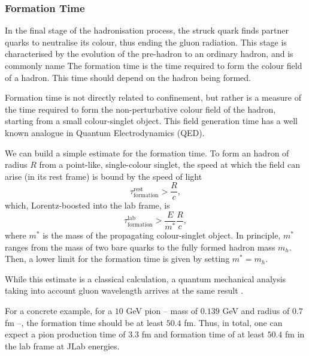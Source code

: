 \subsubsection{Formation Time}
\label{sssec::formation_time}
    In the final stage of the hadronisation process, the struck quark finds partner quarks to neutralise its colour, thus ending the gluon radiation.
    This stage is characterised by the evolution of the pre-hadron to an ordinary hadron, and is commonly name
    The formation time is the time required to form the colour field of a hadron.
    This time should depend on the hadron being formed.

    Formation time is not directly related to confinement, but rather is a measure of the time required to form the non-perturbative colour field of the hadron, starting from a small colour-singlet object.
    This field generation time has a well known analogue in Quantum Electrodynamics (QED).

    We can build a simple estimate for the formation time.
    To form an hadron of radius $R$ from a point-like, single-colour singlet, the speed at which the field can arise (in its rest frame) is bound by the speed of light
    \begin{equation*}
        \tau^\text{rest}_\text{formation} > \frac{R}{c},
    \end{equation*}
    which, Lorentz-boosted into the lab frame, is
    \begin{equation*}
        \tau^\text{lab}_\text{formation} > \frac{E}{m^*} \frac{R}{c},
    \end{equation*}
    where $m^*$ is the mass of the propagating colour-singlet object.
    In principle, $m^*$ ranges from the mass of two bare quarks to the fully formed hadron mass $m_h$.
    Then, a lower limit for the formation time is given by setting $m^* = m_h$.

    While this estimate is a classical calculation, a quantum mechanical analysis taking into account gluon wavelength arrives at the same result \cite{dokshitzer1991}.

    For a concrete example, for a $10$ GeV pion -- mass of $0.139$ GeV and radius of $0.7$ fm --, the formation time should be at least $50.4$ fm.
    Thus, in total, one can expect a pion production time of $3.3$ fm and formation time of at least $50.4$ fm in the lab frame at JLab energies.
